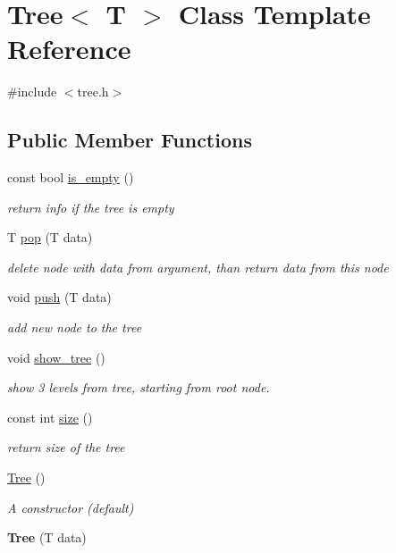 \hypertarget{class_tree}{}\section{Tree$<$ T $>$ Class Template Reference}
\label{class_tree}


{\ttfamily \#include $<$tree.\+h$>$}

\subsection*{Public Member Functions}
\begin{DoxyCompactItemize}
\item 
const bool \hyperlink{class_tree_aa119545d5d6150991f6fedd9d3228f3b}{is\+\_\+empty} ()
\begin{DoxyCompactList}\small\item\em return info if the tree is empty \end{DoxyCompactList}\item 
T \hyperlink{class_tree_ad6d219c36ddc01167033f023a1dcacb6}{pop} (T data)
\begin{DoxyCompactList}\small\item\em delete node with data from argument, than return data from this node \end{DoxyCompactList}\item 
void \hyperlink{class_tree_aa4770f34190c5fa521af4daeaa29897f}{push} (T data)
\begin{DoxyCompactList}\small\item\em add new node to the tree \end{DoxyCompactList}\item 
void \hyperlink{class_tree_a942e97d64f27142f8fa765fb2e5b1a2f}{show\+\_\+tree} ()
\begin{DoxyCompactList}\small\item\em show 3 levels from tree, starting from root node. \end{DoxyCompactList}\item 
const int \hyperlink{class_tree_aa3b52f331cae9b52dc5262fa33b09fc2}{size} ()
\begin{DoxyCompactList}\small\item\em return size of the tree \end{DoxyCompactList}\item 
\hyperlink{class_tree_a30ebe31999547d31fea5b40cc805f6a2}{Tree} ()
\begin{DoxyCompactList}\small\item\em A constructor (default) \end{DoxyCompactList}\item 
\hypertarget{class_tree_ade4d2a6282967bbe2ad5157e056d1562}{}{\bfseries Tree} (T data)\label{class_tree_ade4d2a6282967bbe2ad5157e056d1562}

\end{DoxyCompactItemize}

